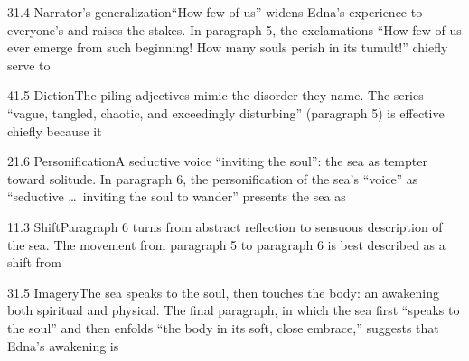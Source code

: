\documentclass[11pt]{article}
\begin{document}
\begin{q}{3}{1.4 Narrator's generalization}{``How few of us'' widens Edna's experience to everyone's and raises the stakes.}
In paragraph 5, the exclamations ``How few of us ever emerge from such beginning! How many souls perish in its tumult!'' chiefly serve to
\end{q}

\begin{q}{4}{1.5 Diction}{The piling adjectives mimic the disorder they name.}
The series ``vague, tangled, chaotic, and exceedingly disturbing'' (paragraph 5) is effective chiefly because it
\end{q}

\begin{q}{2}{1.6 Personification}{A seductive voice ``inviting the soul'': the sea as tempter toward solitude.}
In paragraph 6, the personification of the sea's ``voice'' as ``seductive \ldots\ inviting the soul to wander'' presents the sea as
\end{q}

\begin{q}{1}{1.3 Shift}{Paragraph 6 turns from abstract reflection to sensuous description of the sea.}
The movement from paragraph 5 to paragraph 6 is best described as a shift from
\end{q}

\begin{q}{3}{1.5 Imagery}{The sea speaks to the soul, then touches the body: an awakening both spiritual and physical.}
The final paragraph, in which the sea first ``speaks to the soul'' and then enfolds ``the body in its soft, close embrace,'' suggests that Edna's awakening is
\end{q}
\end{document}
